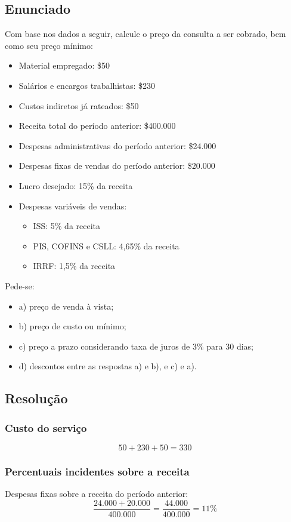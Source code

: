 \documentclass[12pt]{article}
\begin{document}
\subsection{Enunciado}
\label{sec:org663434c}
Com base nos dados a seguir, calcule o preço da consulta a ser cobrado, bem como seu preço mínimo:
\begin{itemize}
\item Material empregado: \$50
\item Salários e encargos trabalhistas: \$230
\item Custos indiretos já rateados: \$50
\item Receita total do período anterior: \$400.000
\item Despesas administrativas do período anterior: \$24.000
\item Despesas fixas de vendas do período anterior: \$20.000
\item Lucro desejado: 15\% da receita
\item Despesas variáveis de vendas:
\begin{itemize}
\item ISS: 5\% da receita
\item PIS, COFINS e CSLL: 4,65\% da receita
\item IRRF: 1,5\% da receita
\end{itemize}
\end{itemize}

Pede-se:
\begin{itemize}
\item a) preço de venda à vista;
\item b) preço de custo ou mínimo;
\item c) preço a prazo considerando taxa de juros de 3\% para 30 dias;
\item d) descontos entre as respostas a) e b), e c) e a).
\end{itemize}

\subsection{Resolução}
\label{sec:org12f0ddc}

\subsubsection{Custo do serviço}
\label{sec:org5fcb405}
\[
50 + 230 + 50 = 330
\]

\subsubsection{Percentuais incidentes sobre a receita}
\label{sec:orgfed49a6}
Despesas fixas sobre a receita do período anterior:
\[
\frac{24.000 + 20.000}{400.000} = \frac{44.000}{400.000} = 11\%
\]
\end{document}
